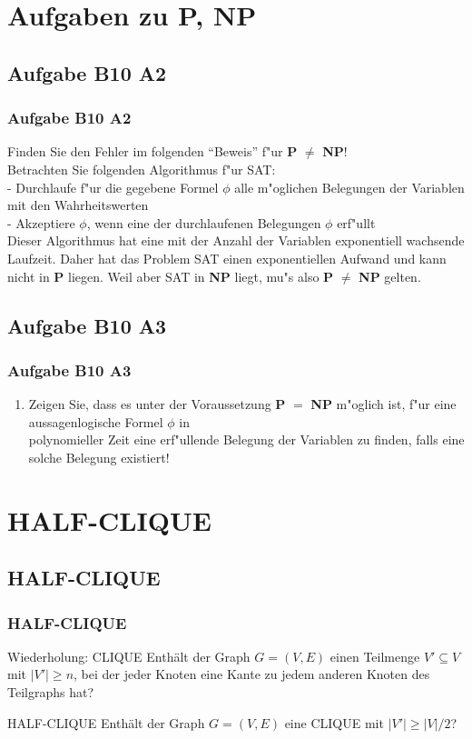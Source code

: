 \section{Aufgaben zu P, NP}
\subsection{Aufgabe B10 A2}
\begin{frame}
	\frametitle{Aufgabe B10 A2}
	Finden Sie den Fehler im folgenden ``Beweis'' f"ur \textbf{P} $\not=$ \textbf{NP}!\\
	Betrachten Sie folgenden Algorithmus f"ur SAT:\\[4pt]
	- Durchlaufe f"ur die gegebene Formel $\phi$ alle m"oglichen Belegungen der
	Variablen mit den Wahrheitswerten\\
	- Akzeptiere $\phi$, wenn eine der durchlaufenen Belegungen $\phi$ erf"ullt\\[4pt]
	Dieser Algorithmus hat eine mit der Anzahl der Variablen exponentiell wachsende
	Laufzeit. Daher hat das Problem SAT einen exponentiellen Aufwand und kann nicht in
	\textbf{P} liegen. Weil aber SAT in \textbf{NP} liegt, mu"s also \textbf{P} $\not=$
	\textbf{NP} gelten.
\end{frame}
\subsection{Aufgabe B10 A3}
\begin{frame}
	\frametitle{Aufgabe B10 A3}
	\begin{enumerate}
		\item Zeigen Sie, dass es unter der Voraussetzung \textbf{P} $=$ \textbf{NP} m"oglich
		ist, f"ur eine aussagenlogische Formel $\phi$ in\\
		polynomieller Zeit eine erf"ullende Belegung der Variablen zu finden, falls eine
		solche Belegung existiert!
	\end{enumerate}
\end{frame}

\section{HALF-CLIQUE}
\subsection{HALF-CLIQUE}
\begin{frame}
	\frametitle{HALF-CLIQUE}
	\begin{block}{Wiederholung: CLIQUE}
		Enthält der Graph $G = (V, E)$ einen Teilmenge $V' \subseteq V$ mit $|V'| \geq n$, bei der jeder Knoten eine Kante zu jedem anderen Knoten des Teilgraphs hat?
	\end{block}
	\begin{block}{HALF-CLIQUE}
		Enthält der Graph $G = (V, E)$ eine CLIQUE mit $|V'| \geq |V|/2$?
	\end{block}
\end{frame}
